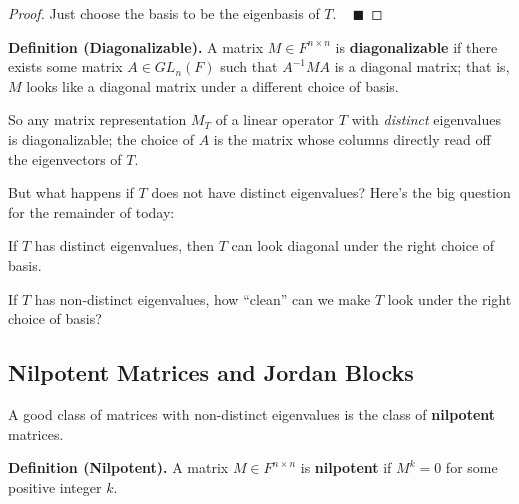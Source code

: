 \begin{proof}
    Just choose the basis to be the eigenbasis of $T$. ~ $\blacksquare$
\end{proof}

\textbf{Definition (Diagonalizable).} A matrix $M \in F^{n \times n}$ is \textbf{diagonalizable} if there exists some matrix $A \in GL_n(F)$ such that $A^{-1}MA$ is a diagonal matrix; that is, $M$ looks like a diagonal matrix under a different choice of basis.

So any matrix representation $M_T$ of a linear operator $T$ with \emph{distinct} eigenvalues is diagonalizable; the choice of $A$ is the matrix whose columns directly read off the eigenvectors of $T$.

But what happens if $T$ does not have distinct eigenvalues?  Here's the big question for the remainder of today:

\begin{boxed-text}[44em]

If $T$ has distinct eigenvalues, then $T$ can look diagonal under the right choice of basis.

If $T$ has non-distinct eigenvalues, how ``clean'' can we make $T$ look under the right choice of basis?

\end{boxed-text}

\subsection{Nilpotent Matrices and Jordan Blocks}

A good class of matrices with non-distinct eigenvalues is the class of \textbf{nilpotent} matrices.

\textbf{Definition (Nilpotent).} A matrix $M \in F^{n \times n}$ is \textbf{nilpotent} if $M^k = 0$ for some positive integer $k$.

